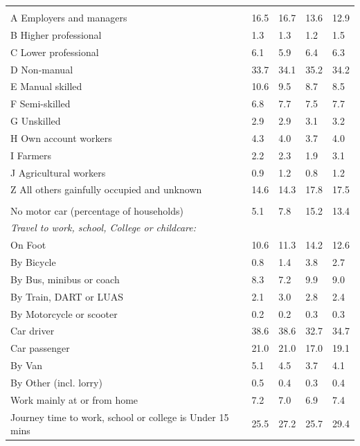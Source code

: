 \documentclass{article}
\begin{document}
\begin{table}[h]
\begin{tabular}{KTTTT}
\hline
    \\ 
    \hline
A Employers and managers & 16.5& 16.7& 13.6& 12.9\\
B Higher professional & 1.3& 1.3& 1.2& 1.5\\
C Lower professional & 6.1& 5.9& 6.4& 6.3\\
D Non-manual & 33.7& 34.1& 35.2& 34.2\\
E Manual skilled & 10.6&  9.5&  8.7&  8.5\\
F Semi-skilled & 6.8& 7.7& 7.5& 7.7\\
G Unskilled & 2.9& 2.9& 3.1& 3.2\\
H Own account workers & 4.3& 4.0& 3.7& 4.0\\
I Farmers & 2.2& 2.3& 1.9& 3.1\\
J Agricultural workers & 0.9& 1.2& 0.8& 1.2\\
Z All others gainfully occupied and unknown & 14.6& 14.3& 17.8& 17.5\\
\hline
{}\hline
    \\ 
    \hline
No motor car (percentage of households) &  5.1&  7.8& 15.2& 
13.4\\
    \hline 
\emph{Travel to work, school, College or childcare:} & & & \\
\quad On Foot & 10.6& 11.3& 14.2& 12.6\\ 
\quad By Bicycle & 0.8& 1.4& 3.8& 2.7\\ 
\quad By Bus, minibus or coach & 8.3& 7.2& 9.9& 9.0\\
\quad By Train, DART or LUAS & 2.1& 3.0& 2.8& 2.4\\
\quad By Motorcycle or scooter & 0.2& 0.2& 0.3& 0.3\\
\quad Car driver & 38.6 & 38.6& 32.7& 34.7\\
\quad Car passenger & 21.0& 21.0& 17.0& 19.1\\
\quad By Van & 5.1& 4.5& 3.7& 4.1\\
\quad By Other (incl. lorry) & 0.5& 0.4& 0.3& 0.4\\
    \hline
Work mainly at or from home & 7.2& 7.0& 6.9& 7.4\\
Journey time to work, school or college is Under 15 mins & 25.5& 27.2& 25.7& 29.4\\

\end{tabular}
\end{table}
\end{document}

